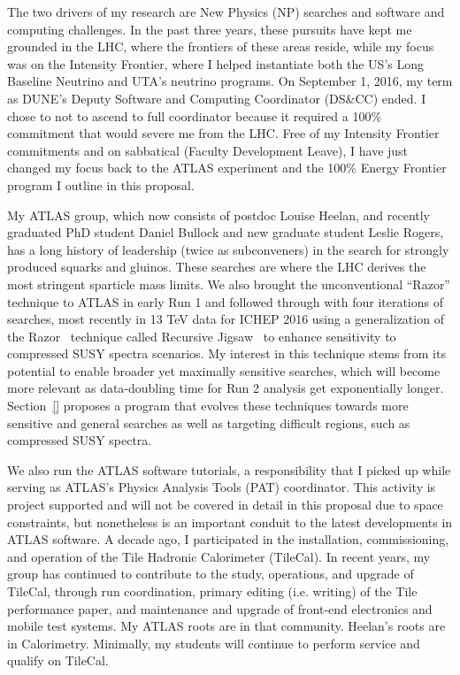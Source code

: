 
The two drivers of my research are New Physics (NP) searches and
software and computing challenges. In the past three years, these
pursuits have kept me grounded in the LHC, where the frontiers of
these areas reside, while my focus was on the Intensity Frontier,
where I helped instantiate both the US's Long Baseline Neutrino and
UTA's neutrino programs. On September 1, 2016, my term as DUNE's
Deputy Software and Computing Coordinator (DS\&CC) ended. I chose to
not to ascend to full coordinator because it required a 100\%
commitment that would severe me from the LHC. Free of my Intensity
Frontier commitments and on sabbatical (Faculty Development Leave), I
have just changed my focus back to the ATLAS experiment and the 100\%
Energy Frontier program I outline in this proposal.

My ATLAS group, which now consists of postdoc Louise Heelan, and
recently graduated PhD student Daniel Bullock and new graduate student
Leslie Rogers, has a long history of leadership (twice as
subconveners) in the search for strongly produced squarks and
gluinos. These searches are where the LHC derives the most stringent
sparticle mass limits. We also brought the unconventional ``Razor''
technique to ATLAS in early Run 1 and followed through with four
iterations of searches, most recently in 13 TeV data for ICHEP 2016
using a generalization of the Razor~\cite{} technique called Recursive
Jigsaw~\cite{} to enhance sensitivity to compressed SUSY spectra
scenarios. My interest in this technique stems from its potential to
enable broader yet maximally sensitive searches, which will become
more relevant as data-doubling time for Run 2 analysis get
exponentially longer.  Section~\ref{} proposes a program that evolves
these techniques towards more sensitive and general searches as well
as targeting difficult regions, such as compressed SUSY spectra.

We also run the ATLAS software tutorials, a responsibility that I
picked up while serving as ATLAS's Physics Analysis Tools (PAT)
coordinator. This activity is project supported and will not be
covered in detail in this proposal due to space constraints, but
nonetheless is an important conduit to the latest developments in
ATLAS software. A decade ago, I participated in the installation,
commissioning, and operation of the Tile Hadronic Calorimeter
(TileCal). In recent years, my group has continued to contribute to
the study, operations, and upgrade of TileCal, through run
coordination, primary editing (i.e. writing) of the Tile performance
paper, and maintenance and upgrade of front-end electronics and mobile
test systems. My ATLAS roots are in that community. Heelan's roots are
in Calorimetry. Minimally, my students will continue to perform
service and qualify on TileCal.

